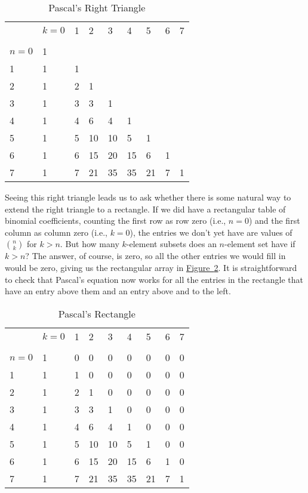 \documentclass[10pt,]{book}
\theoremstyle{plain}
\theoremstyle{definition}
\theoremstyle{definition}
\numberwithin{equation}{chapter}
\newcommand{\hrulethin}  {\noalign{\hrule height 0.04em}}
\begin{document}
\begin{table}
\centering
\begin{tabular}{lllllllll}
&\(k=0\)&1&2&3&4&5&6&7\tabularnewline[0pt]
&&&&&&&&\tabularnewline\hrulethin
\(n=0\)&1&&&&&&\tabularnewline[0pt]
1&1&1&&&&&\tabularnewline[0pt]
2&1&2&1&&&&&\tabularnewline[0pt]
3&1&3&3&1&&&&\tabularnewline[0pt]
4&1&4&6&4&1&&&\tabularnewline[0pt]
5&1&5&10&10&5&1&&\tabularnewline[0pt]
6&1&6&15&20&15&6&1&\tabularnewline[0pt]
7&1&7&21&35&35&21&7&1
\end{tabular}
\caption{Pascal's Right Triangle\label{Pascalrighttriangle}}
\end{table}
Seeing this right triangle leads us to ask whether there is some natural way to extend the right triangle to a rectangle. If we did have a rectangular table of binomial coefficients, counting the first row as row zero (i.e., \(n=0\)) and the first column as column zero (i.e., \(k=0\)), the entries we don't yet have are values of \(\binom{n}{k}\) for \(k>n\). But how many \(k\)-element subsets does an \(n\)-element set have if \(k>n\)? The answer, of course, is zero, so all the other entries we would fill in would be zero, giving us the rectangular array in \hyperref[Pascal_sRectangle]{Figure~\ref{Pascal_sRectangle}}. It is straightforward to check that Pascal's equation now works for all the entries in the rectangle that have an entry above them and an entry above and to the left.%
\begin{table}
\centering
\begin{tabular}{lllllllll}
&\(k=0\)&1&2&3&4&5&6&7\tabularnewline[0pt]
&&&&&&&&\tabularnewline\hrulethin
\(n=0\)&1&0&0&0&0&0&0&0\tabularnewline[0pt]
1&1&1&0&0&0&0&0&0\tabularnewline[0pt]
2&1&2&1&0&0&0&0&0\tabularnewline[0pt]
3&1&3&3&1&0&0&0&0\tabularnewline[0pt]
4&1&4&6&4&1&0&0&0\tabularnewline[0pt]
5&1&5&10&10&5&1&0&0\tabularnewline[0pt]
6&1&6&15&20&15&6&1&0\tabularnewline[0pt]
7&1&7&21&35&35&21&7&1
\end{tabular}
\caption{Pascal's Rectangle\label{Pascal_sRectangle}}
\end{table}
\end{document}
